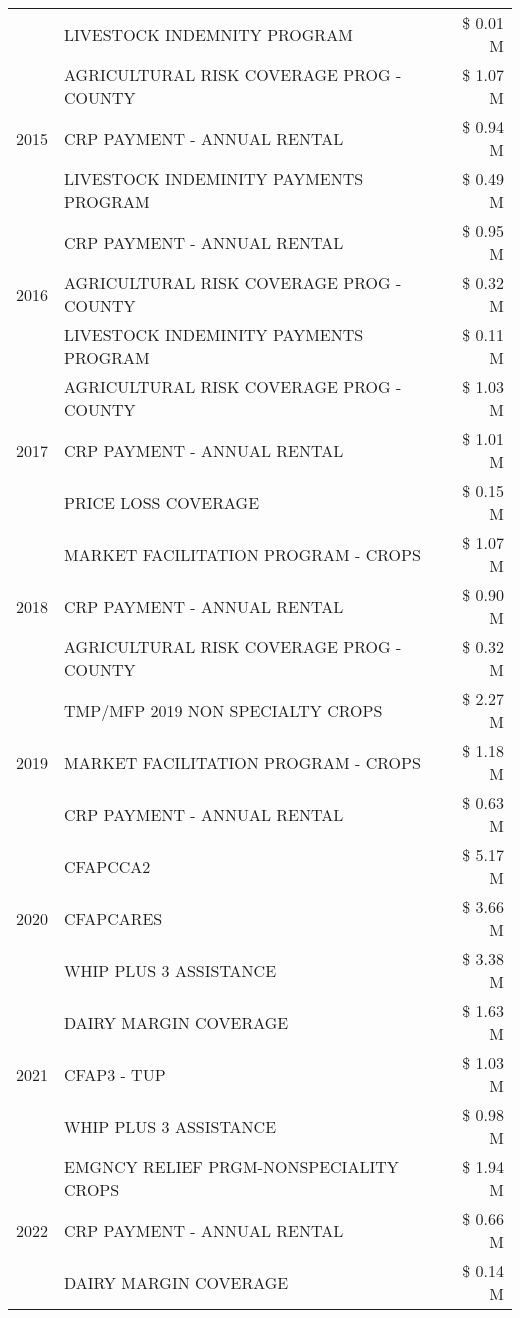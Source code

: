 \begin{tabular}{llr}
 & LIVESTOCK INDEMNITY PROGRAM & \$ 0.01 M \\
\cline{1-3}
\multirow[t]{3}{*}{2015} & AGRICULTURAL RISK COVERAGE PROG - COUNTY & \$ 1.07 M \\
 & CRP PAYMENT - ANNUAL RENTAL & \$ 0.94 M \\
 & LIVESTOCK INDEMINITY PAYMENTS PROGRAM & \$ 0.49 M \\
\cline{1-3}
\multirow[t]{3}{*}{2016} & CRP PAYMENT - ANNUAL RENTAL & \$ 0.95 M \\
 & AGRICULTURAL RISK COVERAGE PROG - COUNTY & \$ 0.32 M \\
 & LIVESTOCK INDEMINITY PAYMENTS PROGRAM & \$ 0.11 M \\
\cline{1-3}
\multirow[t]{3}{*}{2017} & AGRICULTURAL RISK COVERAGE PROG - COUNTY & \$ 1.03 M \\
 & CRP PAYMENT - ANNUAL RENTAL & \$ 1.01 M \\
 & PRICE LOSS COVERAGE & \$ 0.15 M \\
\cline{1-3}
\multirow[t]{3}{*}{2018} & MARKET FACILITATION PROGRAM - CROPS & \$ 1.07 M \\
 & CRP PAYMENT - ANNUAL RENTAL & \$ 0.90 M \\
 & AGRICULTURAL RISK COVERAGE PROG - COUNTY & \$ 0.32 M \\
\cline{1-3}
\multirow[t]{3}{*}{2019} & TMP/MFP 2019 NON SPECIALTY CROPS & \$ 2.27 M \\
 & MARKET FACILITATION PROGRAM - CROPS & \$ 1.18 M \\
 & CRP PAYMENT - ANNUAL RENTAL & \$ 0.63 M \\
\cline{1-3}
\multirow[t]{3}{*}{2020} & CFAPCCA2 & \$ 5.17 M \\
 & CFAPCARES & \$ 3.66 M \\
 & WHIP PLUS 3 ASSISTANCE & \$ 3.38 M \\
\cline{1-3}
\multirow[t]{3}{*}{2021} & DAIRY MARGIN COVERAGE & \$ 1.63 M \\
 & CFAP3 - TUP & \$ 1.03 M \\
 & WHIP PLUS 3 ASSISTANCE & \$ 0.98 M \\
\cline{1-3}
\multirow[t]{3}{*}{2022} & EMGNCY RELIEF PRGM-NONSPECIALITY CROPS & \$ 1.94 M \\
 & CRP PAYMENT - ANNUAL RENTAL & \$ 0.66 M \\
 & DAIRY MARGIN COVERAGE & \$ 0.14 M \\
\cline{1-3}
\bottomrule
\end{tabular}
